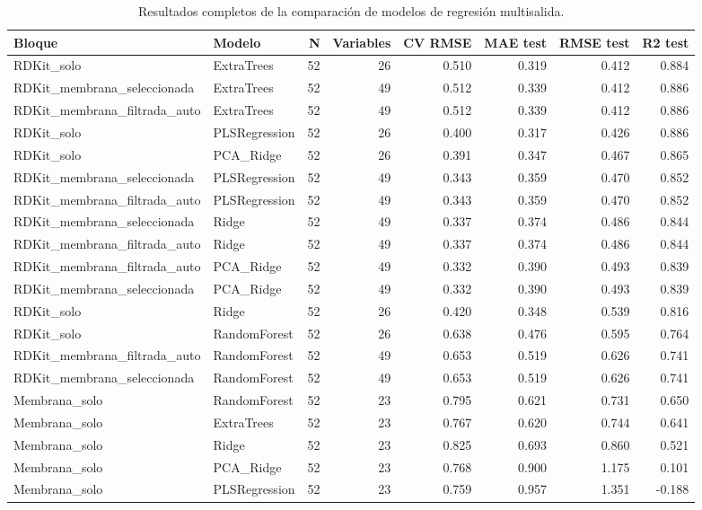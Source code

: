 \documentclass[
  spanish,
  a4paper,
  12pt,
  oneside,
  openany]{memoir}
\begin{document}
\begin{longtable}[t]{llrrrrrr}
\caption{\label{tab:code-anexo-modelos-completos}Resultados completos de la comparación de modelos de regresión multisalida.}\\
\toprule
Bloque & Modelo & N & Variables & CV RMSE & MAE test & RMSE test & R2 test\\
\midrule
RDKit\_solo & ExtraTrees & 52 & 26 & 0.510 & 0.319 & 0.412 & 0.884\\
RDKit\_membrana\_seleccionada & ExtraTrees & 52 & 49 & 0.512 & 0.339 & 0.412 & 0.886\\
RDKit\_membrana\_filtrada\_auto & ExtraTrees & 52 & 49 & 0.512 & 0.339 & 0.412 & 0.886\\
RDKit\_solo & PLSRegression & 52 & 26 & 0.400 & 0.317 & 0.426 & 0.886\\
RDKit\_solo & PCA\_Ridge & 52 & 26 & 0.391 & 0.347 & 0.467 & 0.865\\
\addlinespace
RDKit\_membrana\_seleccionada & PLSRegression & 52 & 49 & 0.343 & 0.359 & 0.470 & 0.852\\
RDKit\_membrana\_filtrada\_auto & PLSRegression & 52 & 49 & 0.343 & 0.359 & 0.470 & 0.852\\
RDKit\_membrana\_seleccionada & Ridge & 52 & 49 & 0.337 & 0.374 & 0.486 & 0.844\\
RDKit\_membrana\_filtrada\_auto & Ridge & 52 & 49 & 0.337 & 0.374 & 0.486 & 0.844\\
RDKit\_membrana\_filtrada\_auto & PCA\_Ridge & 52 & 49 & 0.332 & 0.390 & 0.493 & 0.839\\
\addlinespace
RDKit\_membrana\_seleccionada & PCA\_Ridge & 52 & 49 & 0.332 & 0.390 & 0.493 & 0.839\\
RDKit\_solo & Ridge & 52 & 26 & 0.420 & 0.348 & 0.539 & 0.816\\
RDKit\_solo & RandomForest & 52 & 26 & 0.638 & 0.476 & 0.595 & 0.764\\
RDKit\_membrana\_filtrada\_auto & RandomForest & 52 & 49 & 0.653 & 0.519 & 0.626 & 0.741\\
RDKit\_membrana\_seleccionada & RandomForest & 52 & 49 & 0.653 & 0.519 & 0.626 & 0.741\\
\addlinespace
Membrana\_solo & RandomForest & 52 & 23 & 0.795 & 0.621 & 0.731 & 0.650\\
Membrana\_solo & ExtraTrees & 52 & 23 & 0.767 & 0.620 & 0.744 & 0.641\\
Membrana\_solo & Ridge & 52 & 23 & 0.825 & 0.693 & 0.860 & 0.521\\
Membrana\_solo & PCA\_Ridge & 52 & 23 & 0.768 & 0.900 & 1.175 & 0.101\\
Membrana\_solo & PLSRegression & 52 & 23 & 0.759 & 0.957 & 1.351 & -0.188\\
\bottomrule
\end{longtable}
\endgroup
\end{document}
